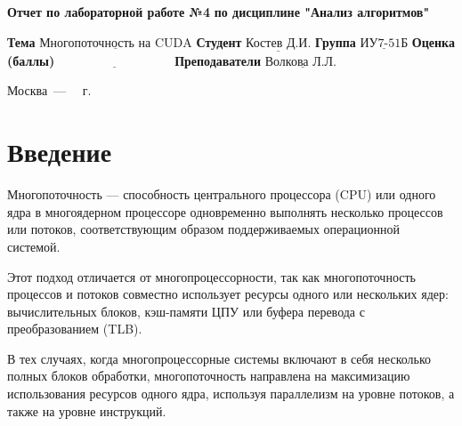 \documentclass[12pt]{report}
\begin{document}
\begin{titlepage}
	
	\begin{center}
		\noindent\begin{minipage}{1.3\textwidth}\centering
			\Large\textbf{  Отчет по лабораторной работе №4}\newline
			\textbf{по дисциплине "Анализ алгоритмов"}\newline\newline
		\end{minipage}
	\end{center}
	
	\noindent\textbf{Тема} $\underline{\text{Многопоточность на CUDA}}$\newline\newline
	\noindent\textbf{Студент} $\underline{\text{Костев Д.И.}}$\newline\newline
	\noindent\textbf{Группа} $\underline{\text{ИУ7-51Б}}$\newline\newline
	\noindent\textbf{Оценка (баллы)} $\underline{\text{~~~~~~~~~~~~~~~~~~~~~~~~~~~}}$\newline\newline
	\noindent\textbf{Преподаватели} $\underline{\text{Волкова Л.Л. }}$\newline\newline\newline
	
	\begin{center}
		\vfill
		Москва~---~\the\year
		~г.
	\end{center}
\end{titlepage}

\setcounter{page}{2}
\tableofcontents

\newpage
\chapter*{Введение}
Многопоточность — способность центрального процессора (CPU) или одного ядра в многоядерном процессоре одновременно выполнять несколько процессов или потоков, соответствующим образом поддерживаемых операционной системой.

Этот подход отличается от многопроцессорности, так как многопоточность процессов и потоков совместно использует ресурсы одного или нескольких ядер: вычислительных блоков, кэш-памяти ЦПУ или буфера перевода с преобразованием (TLB).


В тех случаях, когда многопроцессорные системы включают в себя несколько полных блоков обработки, многопоточность направлена на максимизацию использования ресурсов одного ядра, используя параллелизм на уровне потоков, а также на уровне инструкций.
\end{document}
